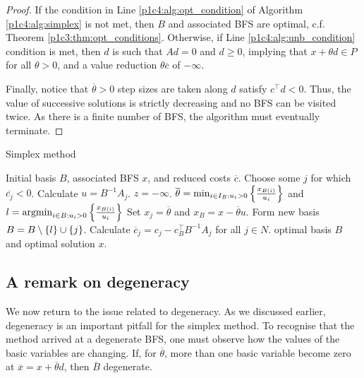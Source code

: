 \begin{proof}
	If the condition in Line \ref{p1c4:alg:opt_condition} of Algorithm \ref{p1c4:alg:simplex} is not met, then $B$ and associated BFS are optimal, c.f. Theorem \ref{p1c3:thm:opt_conditions}. Otherwise, if Line \ref{p1c4:alg:unb_condition} condition is met, then $d$ is such that $Ad = 0$ and $d \geq 0$, implying that $x + \theta d \in P$ for all $\theta > 0$, and a value reduction $\theta\overline{c}$ of $-\infty$.
	
	Finally, notice that $\overline{\theta}>0$ step sizes are taken along $d$ satisfy $c^\top d < 0$. Thus, the value of successive solutions is strictly decreasing and no BFS can be visited twice. As there is a finite number of BFS, the algorithm must eventually terminate.
\end{proof}

\begin{algorithm}[h]
	\caption{Simplex method} \label{p1c4:alg:simplex}
	\begin{algorithmic}[1] %
		 Initial basis $B$, associated BFS $x$, and reduced costs $\overline{c}$.
		 \label{p1c4:alg:opt_condition} 
		    \State Choose some $j$ for which $\overline{c_j} < 0$. Calculate $u = B^{-1}A_j$. 
		     \label{p1c4:alg:unb_condition}
				 $z = -\infty$.		
			\Else
				\State $\overline{\theta} = \min_{i \in I_B : u_i > 0} \left\{ \frac{x_{B(i)}}{u_i} \right \}$ and $l = \mathop{\rm argmin}_{i \in B : u_i > 0} \left\{ \frac{x_{B(i)}}{u_i} \right \}$ 
				\State Set $x_j = \overline{\theta}$ and $x_B = x - \overline{\theta}u$. Form new basis $B = B \setminus \left\{ l \right \} \cup \left\{ j \right \}$.  
				\State Calculate $\overline{c}_j = c_j - c_B^\top B^{-1}A_j$ for all $j \in N$.
			\EndIf
		\EndWhile
		 optimal basis $B$ and optimal solution $x$.
	\end{algorithmic}
\end{algorithm}


\subsection{A remark on degeneracy}

We now return to the issue related to degeneracy. As we discussed earlier, degeneracy is an important pitfall for the simplex method. To recognise that the method arrived at a degenerate BFS, one must observe how the values of the basic variables are changing. If, for $\overline{\theta}$, more than one basic variable become zero at $\overline{x} = x +\overline{\theta}d$, then $\overline{B}$ degenerate.

